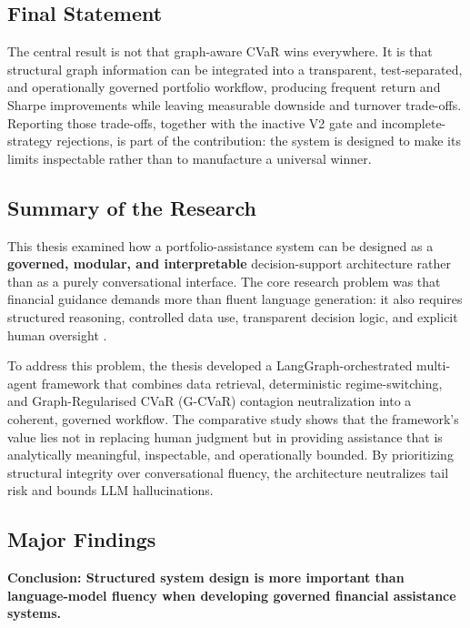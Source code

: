 \documentclass[11pt]{article}
\newcommand{\conclusion}[1]{{\large\textbf{\textcolor{conclusionblue}{Conclusion: }}\textbf{#1}}}
\begin{document}
\subsection{Final Statement}

The central result is not that graph-aware CVaR wins everywhere. It is that structural graph information can be integrated into a transparent, test-separated, and operationally governed portfolio workflow, producing frequent return and Sharpe improvements while leaving measurable downside and turnover trade-offs. Reporting those trade-offs, together with the inactive V2 gate and incomplete-strategy rejections, is part of the contribution: the system is designed to make its limits inspectable rather than to manufacture a universal winner.

\iffalse

\subsection{Summary of the Research}

This thesis examined how a portfolio-assistance system can be designed as a \textbf{governed, modular, and interpretable} decision-support architecture rather than as a purely conversational interface. The core research problem was that financial guidance demands more than fluent language generation: it also requires structured reasoning, controlled data use, transparent decision logic, and explicit human oversight \cite{markowitz1952,wooldridge2009,holzinger2016,wu2023}.

To address this problem, the thesis developed a LangGraph-orchestrated multi-agent framework that combines data retrieval, deterministic regime-switching, and Graph-Regularised CVaR (G-CVaR) contagion neutralization into a coherent, governed workflow. The comparative study shows that the framework's value lies not in replacing human judgment but in providing assistance that is analytically meaningful, inspectable, and operationally bounded. By prioritizing structural integrity over conversational fluency, the architecture neutralizes tail risk and bounds LLM hallucinations.

\subsection{Major Findings}

\conclusion{Structured system design is more important than language-model fluency when developing governed financial assistance systems.}
\end{document}
